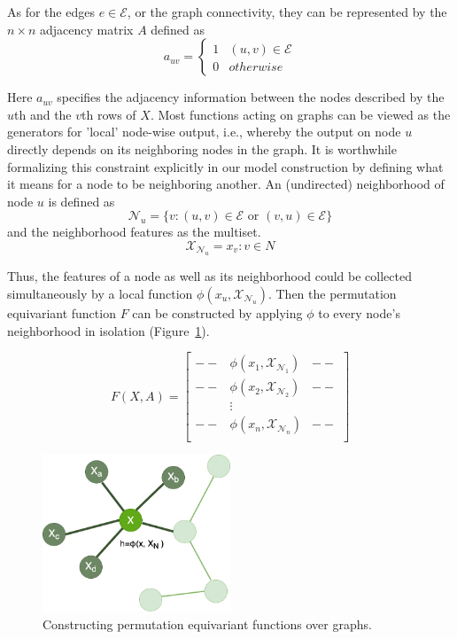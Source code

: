 As for the edges $e\in \mathcal{E}$, or the graph connectivity, they can be represented by the $n\times n$ adjacency matrix $A$ defined as 
\[a_{uv} = \left\{ \begin{array}{rcl}
1 & (u,v)\in \mathcal{E} \\ 0 & otherwise 
\end{array}\right.\]

Here $a_{uv}$  specifies the adjacency information between the nodes described by the $u$th and the $v$th rows of $X$.
Most functions acting on graphs can be viewed as the generators for 'local' node-wise output, i.e., whereby the output on node $u$ directly depends on its neighboring nodes in the graph. It is worthwhile formalizing this constraint explicitly in our model construction by defining what it means for a node to be neighboring another. An (undirected) neighborhood of node $u$ is defined as 
\[\mathcal{N}_u = \{v : (u,v) \in \mathcal{E} \text{ or } (v,u) \in \mathcal{E}\}\]
and the neighborhood features as the multiset\cite{10.48550/arxiv.2104.13478}.
\[\mathcal{X}_{\mathcal{N}_u}={{x_v:v\in N}}\]

Thus, the features of a node as well as its neighborhood could be collected simultaneously by a local function $\phi(x_u,\mathcal{X}_{\mathcal{N}_u}) $. Then the permutation equivariant function $F$ can be constructed by applying $\phi$ to every node's neighborhood in isolation (Figure~\ref{fig:graphupdate}).

$$ F(X,A) = \left[ \begin{array}{rcl}
-- & \phi(x_1,\mathcal{X}_{\mathcal{N}_1}) & -- \\
-- & \phi(x_2,\mathcal{X}_{\mathcal{N}_2}) & -- \\
& \vdots & \\
-- & \phi(x_n,\mathcal{X}_{\mathcal{N}_n}) & --\\

    
\end{array}\right] $$

\begin{figure}[h]
    \centering
    \includegraphics[width=0.5\textwidth]{figures/02_GraphFeature.png}
    \caption{Constructing permutation equivariant functions over graphs.}
    \label{fig:graphupdate}
\end{figure}




